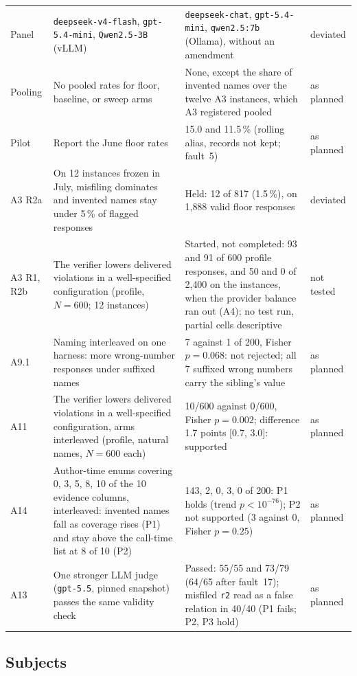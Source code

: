 \documentclass[journal]{IEEEtran}
\begin{document}
\begin{table}[!tp]
\begin{tabular}{@{}lp{5.4cm}p{8.9cm}l@{}}
Panel & \texttt{deepseek-v4-flash}, \texttt{gpt-5.4-mini}, \texttt{Qwen2.5-3B} (vLLM) & \texttt{deepseek-chat}, \texttt{gpt-5.4-mini}, \texttt{qwen2.5:7b} (Ollama), without an amendment & deviated \\
Pooling & No pooled rates for floor, baseline, or sweep arms & None, except the share of invented names over the twelve A3 instances, which A3 registered pooled & as planned \\
Pilot & Report the June floor rates & 15.0 and 11.5\,\% (rolling alias, records not kept; fault~5) & as planned \\
\midrule
A3 R2a & On 12 instances frozen in July, misfiling dominates and invented names stay under 5\,\% of flagged responses & Held: 12 of 817 (1.5\,\%), on 1{,}888 valid floor responses & deviated \\
A3 R1, R2b & The verifier lowers delivered violations in a well-specified configuration (profile, $N=600$; 12 instances) & Started, not completed: 93 and 91 of 600 profile responses, and 50 and 0 of 2{,}400 on the instances, when the provider balance ran out (A4); no test run, partial cells descriptive & not tested \\
A9.1 & Naming interleaved on one harness: more wrong-number responses under suffixed names & 7 against 1 of 200, Fisher $p=0.068$: not rejected; all 7 suffixed wrong numbers carry the sibling's value & as planned \\
A11 & The verifier lowers delivered violations in a well-specified configuration, arms interleaved (profile, natural names, $N=600$ each) & 10/600 against 0/600, Fisher $p=0.002$; difference 1.7 points [0.7, 3.0]: supported & as planned \\
A14 & Author-time enums covering 0, 3, 5, 8, 10 of the 10 evidence columns, interleaved: invented names fall as coverage rises (P1) and stay above the call-time list at 8 of 10 (P2) & 143, 2, 0, 3, 0 of 200: P1 holds (trend $p<10^{-76}$); P2 not supported (3 against 0, Fisher $p=0.25$) & as planned \\
A13 & One stronger LLM judge (\texttt{gpt-5.5}, pinned snapshot) passes the same validity check & Passed: 55/55 and 73/79 (64/65 after fault~17); misfiled \texttt{r2} read as a false relation in 40/40 (P1 fails; P2, P3 hold) & as planned \\
\bottomrule
\end{tabular}
\end{table}

\subsection{Subjects}
\end{document}

